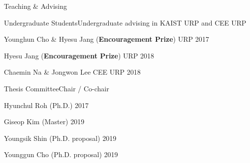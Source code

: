 \begin{rSection}{Teaching \& Advising}
\newpage
\begin{rSubsection}{Undergraduate Students}{}{Undergraduate advising in KAIST \acf{URP} and CEE URP}{}
  \item Younghun Cho \& Hyesu Jang ({\bf Encouragement Prize}) \hfill URP 2017
  \item Hyesu Jang ({\bf Encouragement Prize}) \hfill URP 2018
  \item Chaemin Na \& Jongwon Lee \hfill CEE URP 2018
\end{rSubsection}

\begin{rSubsection}{Thesis Committee}{}{Chair / Co-chair }{}
  \item Hyunchul Roh (Ph.D.) \hfill 2017
  \item Giseop Kim (Master) \hfill 2019
  \item Youngsik Shin (Ph.D. proposal) \hfill 2019
  \item Younggun Cho (Ph.D. proposal) \hfill 2019
\end{rSubsection}

\end{rSection}
